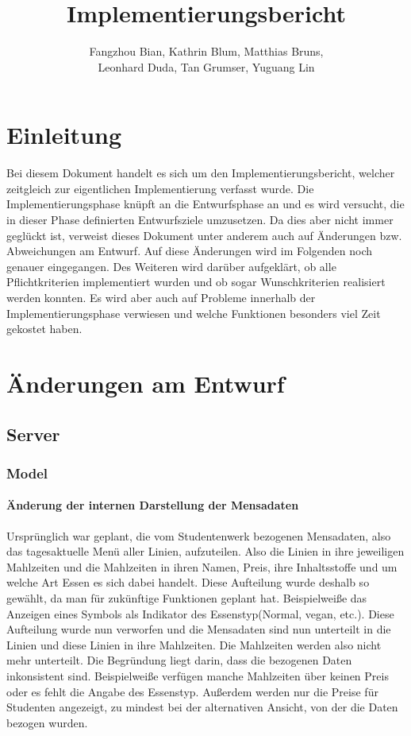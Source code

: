 \documentclass[a4paper]{scrreprt}
\begin{document}
\title{Implementierungsbericht}
\author{Fangzhou Bian, Kathrin Blum, Matthias Bruns, \\Leonhard Duda, Tan Grumser, Yuguang Lin}
\maketitle
\tableofcontents



\chapter{Einleitung}

Bei diesem Dokument handelt es sich um den Implementierungsbericht, welcher zeitgleich zur eigentlichen Implementierung verfasst wurde. Die Implementierungsphase knüpft an die Entwurfsphase an und es wird versucht, die in dieser Phase definierten Entwurfsziele umzusetzen. Da dies aber nicht immer geglückt ist, verweist dieses Dokument unter anderem auch auf Änderungen bzw. Abweichungen am Entwurf. Auf diese Änderungen wird im Folgenden noch genauer eingegangen. Des Weiteren wird darüber aufgeklärt, ob alle Pflichtkriterien implementiert wurden und ob sogar Wunschkriterien realisiert werden konnten. Es wird aber auch auf Probleme innerhalb der Implementierungsphase verwiesen und welche Funktionen besonders viel Zeit gekostet haben.

\chapter{Änderungen am Entwurf}
\section{Server}
\subsection{Model}
\subsubsection{Änderung der internen Darstellung der Mensadaten}
Ursprünglich war geplant, die vom Studentenwerk bezogenen Mensadaten, also das tagesaktuelle Menü aller Linien, aufzuteilen. Also die Linien in ihre jeweiligen Mahlzeiten und die Mahlzeiten in ihren Namen, Preis, ihre Inhaltsstoffe und um welche Art Essen es sich dabei handelt. Diese Aufteilung wurde deshalb so gewählt, da man für zukünftige Funktionen geplant hat. Beispielweiße das Anzeigen eines Symbols als Indikator des Essenstyp(Normal, vegan, etc.). Diese Aufteilung wurde nun verworfen und die Mensadaten sind nun unterteilt in die Linien und diese Linien in ihre Mahlzeiten. Die Mahlzeiten werden also nicht mehr unterteilt. Die Begründung liegt darin, dass die bezogenen Daten inkonsistent sind. Beispielweiße verfügen manche Mahlzeiten über keinen Preis oder es fehlt die Angabe des Essenstyp. Außerdem werden nur die Preise für Studenten angezeigt, zu mindest bei der alternativen Ansicht, von der die Daten bezogen wurden.
\end{document}
